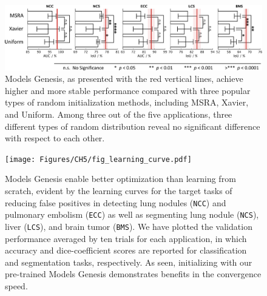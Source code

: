 
\begin{figure}
\begin{center}
\includegraphics[width=0.9\columnwidth]{Figures/CH5/fig_among_scratch.pdf}
\end{center}
\caption[Models Genesis Outperform Learning from Scratch]{
Models Genesis, as presented with the red vertical lines, achieve higher and more stable performance compared with three popular types of random initialization methods, including MSRA, Xavier, and Uniform. Among three out of the five applications, three different types of random distribution reveal no significant difference with respect to each other.
}
\label{ch5:fig:random_initialization}
\end{figure}



\begin{figure}
\begin{center}
\texttt{[image: Figures/CH5/fig\_learning\_curve.pdf]}
\end{center}
\caption[Models Genesis Enable Better Optimization than Learning from Scratch]{
Models Genesis enable better optimization than learning from scratch, evident by the learning curves for the target tasks of reducing false positives in detecting lung nodules (\texttt{NCC}) and pulmonary embolism (\texttt{ECC}) as well as segmenting lung nodule (\texttt{NCS}), liver (\texttt{LCS}), and brain tumor (\texttt{BMS}). We have plotted the validation performance averaged by ten trials for each application, in which accuracy and dice-coefficient scores are reported for classification and segmentation tasks, respectively. As seen, initializing with our pre-trained Models Genesis demonstrates benefits in the convergence speed.
}
\label{ch5:fig:learning_curve}
\end{figure}

